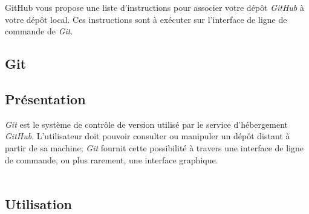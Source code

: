 \documentclass{article}
\begin{document}
\begin{flushleft}
GitHub vous propose une liste d'instructions pour associer votre dépôt \textit{GitHub} à votre dépôt local. Ces instructions sont à exécuter sur l'interface de ligne de commande de \textit{Git}.
\end{flushleft}

\begin{center}\section{Git}\end{center}
\subsection{Présentation}
\textit{Git} est le système de contrôle de version utilisé par le service d'hébergement \textit{GitHub}. L'utilisateur doit pouvoir consulter ou manipuler un dépôt distant à partir de sa machine; \textit{Git} fournit cette possibilité à travers une interface de ligne de commande, ou plus rarement, une interface graphique.\\\\

\subsection{Utilisation}
\end{document}
